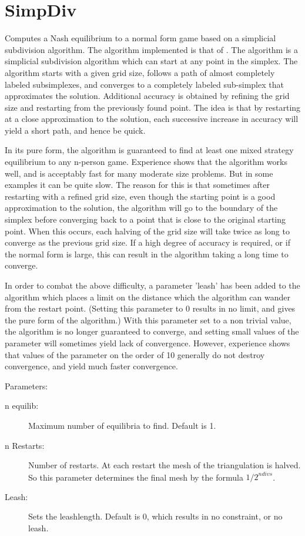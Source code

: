 \section{SimpDiv}
Computes a Nash equilibrium to a normal form game based
on a simplicial subdivision algorithm.  The algorithm implemented is
that of \cite{VTH:1987}.  The algorithm is a simplicial subdivision
algorithm which can start at any point in the simplex.  The algorithm
starts with a given grid size, follows a path of almost completely labeled
subsimplexes, and converges to a completely labeled sub-simplex that
approximates the solution.  Additional accuracy is obtained by refining
the grid size and restarting from the previously found point.  The idea is
that by restarting at a close approximation to the solution, each
successive increase in accuracy will yield a short path, and hence be
quick.

In its pure form, the algorithm is guaranteed to find at least one
mixed strategy equilibrium to any n-person game.  Experience shows
that the algorithm works well, and is acceptably fast for many
moderate size problems.  But in some examples it can be quite slow.
The reason for this is that sometimes after restarting with a refined
grid size, even though the starting point is a good approximation to
the solution, the algorithm will go to the boundary of the simplex
before converging back to a point that is close to the original
starting point.  When this occurs, each halving of the grid size will
take twice as long to converge as the previous grid size.  If a high
degree of accuracy is required, or if the normal form is large, this
can result in the algorithm taking a long time to converge.

In order to combat the above difficulty, a parameter 'leash' has been
added to the algorithm which places a limit on the distance which the
algorithm can wander from the restart point. (Setting this parameter
to 0 results in no limit, and gives the pure form of the algorithm.)
With this parameter set to a non trivial value, the algorithm is no
longer guaranteed to converge, and setting small values of the
parameter will sometimes yield lack of convergence.  However,
experience shows that values of the parameter on the order of 10
generally do not destroy convergence, and yield much faster
convergence.

Parameters:

\begin{description}
\item[n equilib:] Maximum number of equilibria to find. Default is 1.  
\item[n Restarts:] Number of restarts.  At each restart the mesh of the
triangulation is halved.  So this parameter determines the final mesh
by the formula ${1/2}^{ndivs}$.
\item[Leash:] Sets the leashlength. Default is 0, which results in no
constraint, or no leash.  
\end{description}


